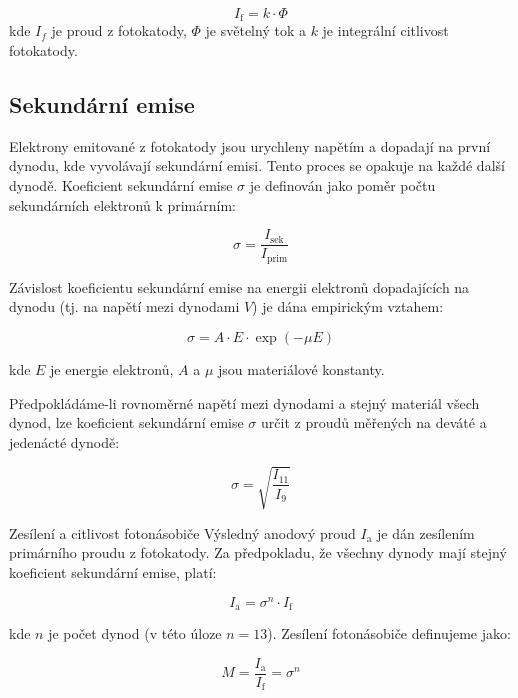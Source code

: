 \documentclass[czech,11pt,a4paper]{article}
\begin{document}
\begin{multicols}{2}
		\begin{equation} I_{\text{f}} = k \cdot \Phi \end{equation}
		kde $I_f$ je proud z fotokatody, $\Phi$ je světelný tok a $k$ je integrální citlivost fotokatody.
		
	\subsection{Sekundární emise}
		Elektrony emitované z fotokatody jsou urychleny napětím a dopadají na první dynodu, kde vyvolávají sekundární emisi. Tento proces se opakuje na každé další dynodě. Koeficient sekundární emise $\sigma$ je definován jako poměr počtu sekundárních elektronů k primárním:
		
		\begin{equation} \sigma = \frac{I_{\text{sek}}}{I_{\text{prim}}} \end{equation}
		
		Závislost koeficientu sekundární emise na energii elektronů dopadajících na dynodu (tj. na napětí mezi dynodami $V$) je dána empirickým vztahem:
		
		\begin{equation} \sigma = A \cdot E \cdot \exp(-\mu E) \end{equation}
		
		kde $E$ je energie elektronů, $A$ a $\mu$ jsou materiálové konstanty.
		
		Předpokládáme-li rovnoměrné napětí mezi dynodami a stejný materiál všech dynod, lze koeficient sekundární emise $\sigma$ určit z proudů měřených na deváté a jedenácté dynodě:
		
		\begin{equation} \sigma = \sqrt{\frac{I_{11}}{I_9}} \end{equation}
		
		Zesílení a citlivost fotonásobiče
		Výsledný anodový proud $I_\mathrm{a}$	je dán zesílením primárního proudu z fotokatody. Za předpokladu, že všechny dynody mají stejný koeficient sekundární emise, platí:
		
		\begin{equation} I_{\text{a}} = \sigma^n \cdot I_{\text{f}} \end{equation}
		
		kde $n$ je počet dynod (v této úloze $n=13$).		
		Zesílení fotonásobiče definujeme jako:
		
		\begin{equation} M = \frac{I_{\text{a}}}{I_{\text{f}}} = \sigma^n \end{equation}
		

\end{multicols}
\end{document}
